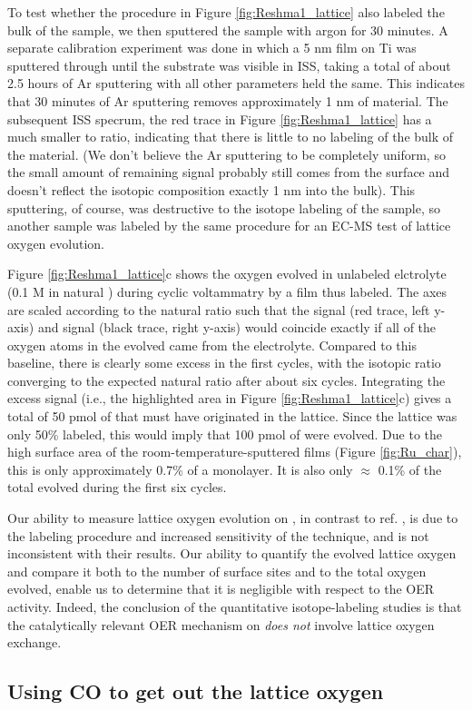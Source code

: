To test whether the procedure in Figure \ref{fig:Reshma1_lattice} also labeled the bulk of the sample, we then sputtered the sample with argon for 30 minutes. A separate calibration experiment was done in which a 5 nm  film on Ti was sputtered through until the substrate was visible in ISS, taking a total of about 2.5 hours of Ar sputtering with all other parameters held the same. This indicates that 30 minutes of Ar sputtering removes approximately 1 nm of material. The subsequent ISS specrum, the red trace in Figure \ref{fig:Reshma1_lattice} has a much smaller  to  ratio, indicating that there is little to no labeling of the bulk of the material. (We don't believe the Ar sputtering to be completely uniform, so the small amount of remaining  signal probably still comes from the surface and doesn't reflect the isotopic composition exactly 1 nm into the bulk). This sputtering, of course, was destructive to the isotope labeling of the sample, so another sample was labeled by the same procedure for an EC-MS test of lattice oxygen evolution.

Figure \ref{fig:Reshma1_lattice}c shows the oxygen evolved in unlabeled elctrolyte (0.1 M  in natural ) during cyclic voltammatry by a film thus labeled. The axes are scaled according to the natural ratio such that the  signal (red trace, left y-axis) and  signal (black trace, right y-axis) would coincide exactly if all of the oxygen atoms in the evolved  came from the electrolyte. Compared to this baseline, there is clearly some excess  in the first cycles, with the isotopic ratio converging to the expected natural ratio after about six cycles. Integrating the excess  signal (i.e., the highlighted area in Figure \ref{fig:Reshma1_lattice}c) gives a total of 50 pmol of  that must have originated in the lattice. Since the lattice was only 50\% labeled, this would imply that 100 pmol of  were evolved. Due to the high surface area of the room-temperature-sputtered films (Figure \ref{fig:Ru_char}), this is only approximately 0.7\% of a monolayer. It is also only $\approx$ 0.1\% of the total  evolved during the first six cycles. 

Our ability to measure lattice oxygen evolution on , in contrast to ref. \cite{Stoerzinger2017}, is due to the labeling procedure and increased sensitivity of the technique, and is not inconsistent with their results. Our ability to quantify the evolved lattice oxygen and compare it both to the number of surface sites and to the total oxygen evolved, enable us to determine that it is negligible with respect to the OER activity. Indeed, the conclusion of the quantitative isotope-labeling studies is that the catalytically relevant OER mechanism on  \textit{does not} involve lattice oxygen exchange.



\subsection{Using CO to get out the lattice oxygen}


